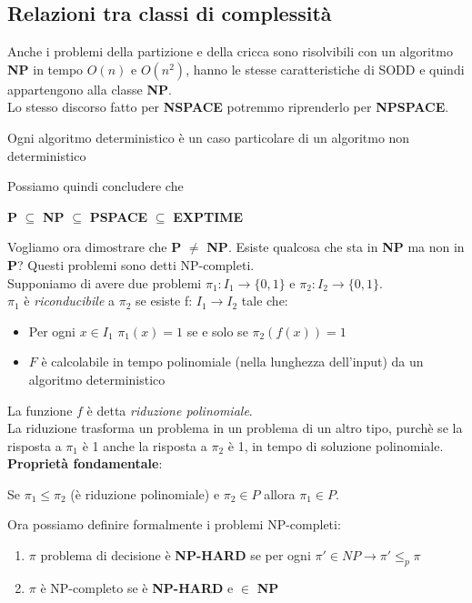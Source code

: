 \subsection{Relazioni tra classi di complessità}
Anche i problemi della partizione e della cricca sono risolvibili con un algoritmo \textbf{NP} in tempo $O(n)$ e $O(n^2)$, hanno le stesse caratteristiche
di SODD e quindi appartengono alla classe \textbf{NP}.\\
Lo stesso discorso fatto per \textbf{NSPACE} potremmo riprenderlo per \textbf{NPSPACE}.
\begin{center}
    Ogni algoritmo deterministico è un caso particolare di un algoritmo non deterministico
\end{center}
Possiamo quindi concludere che 
\begin{center}
    \textbf{P} $\subseteq$ \textbf{NP} $\subseteq$ \textbf{PSPACE} $\subseteq$ \textbf{EXPTIME}
\end{center}
Vogliamo ora dimostrare che \textbf{P} $\neq$ \textbf{NP}. Esiste qualcosa che sta in \textbf{NP} ma non in \textbf{P}?
Questi problemi sono detti NP-completi.\\
Supponiamo di avere due problemi $\pi_1 : I_1 \rightarrow \lbrace 0,1 \rbrace$ e $\pi_2 : I_2 \rightarrow \lbrace 0,1 \rbrace$.\\
$\pi_1$ è \emph{riconducibile} a $\pi_2$ se esiste f: $I_1 \rightarrow I_2$ tale che:
\begin{itemize}
    \item Per ogni $x \in I_1$ $\pi_1(x) = 1$ se e solo se $\pi_2(f(x)) = 1$
    \item $F$ è calcolabile in tempo polinomiale (nella lunghezza dell'input) da un algoritmo deterministico
\end{itemize}

La funzione $f$ è detta \emph{riduzione polinomiale}.\\
La riduzione trasforma un problema in un problema di un altro tipo, purchè 
se la risposta a $\pi_1$ è 1 anche la risposta a $\pi_2$ è 1, in tempo di soluzione polinomiale.\\
\textbf{Proprietà fondamentale}:
\begin{center}
    Se $\pi_1 \le \pi_2$ (è riduzione polinomiale) e $\pi_2 \in P$ allora $\pi_1 \in P$.
\end{center}

\noindent Ora possiamo definire formalmente i problemi NP-completi:
\begin{enumerate}
    \item $\pi$ problema di decisione è \textbf{NP-HARD} se per ogni $\pi' \in NP \rightarrow \pi' \le_p \pi$
    \item $\pi$ è NP-completo se è \textbf{NP-HARD} e $\in$ \textbf{NP} 
\end{enumerate}

